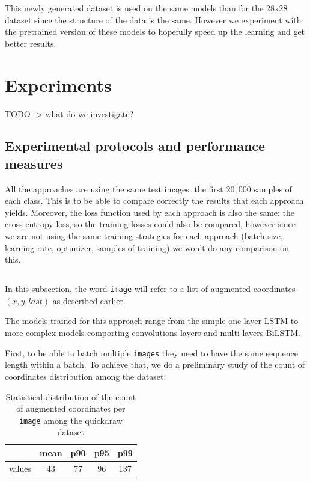 \documentclass[10pt,twocolumn,letterpaper]{article}
\begin{document}
This newly generated dataset is used on the same models than for the 28x28 dataset since the structure of the data is the same. However we experiment with the pretrained version of these models to hopefully speed up the learning and get better results.

\section{Experiments}

TODO -> what do we investigate?

\subsection{Experimental protocols and performance measures}

All the approaches are using the same test images: the first $20,000$ samples of each class. This is to be able to compare correctly the results that each approach yields. Moreover, the loss function used by each approach is also the same: the cross entropy loss, so the training losses could also be compared, however since we are not using the same training strategies for each approach (batch size, learning rate, optimizer, samples of training) we won't do any comparison on this.

\subsection{\rnnTitle{}}

In this subsection, the word \texttt{image} will refer to a list of augmented coordinates $(x, y, last)$ as described earlier.

The models trained for this approach range from the simple one layer LSTM to more complex models comporting convolutions layers and multi layers BiLSTM.

First, to be able to batch multiple \texttt{images} they need to have the same sequence length within a batch. To achieve that, we do a preliminary study of the count of coordinates distribution among the dataset:

\begin{table}[h]
    \centering
    \begin{tabular}{c|c|c|c|c}
          & mean & p90 & p95 & p99 \\
          \hline
         values & 43 & 77 & 96 & 137
    \end{tabular}
    \caption{Statistical distribution of the count of augmented coordinates per \texttt{image} among the quickdraw dataset}
    \label{tab:strokes_stats}
\end{table}
\end{document}
